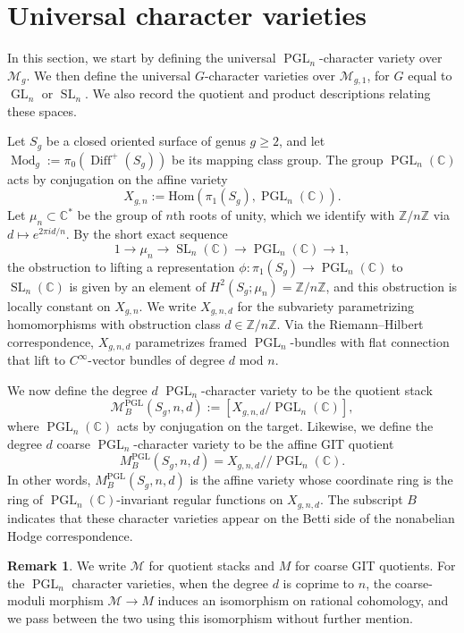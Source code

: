 \documentclass[11pt,reqno]{amsart}
\theoremstyle{plain} %
\theoremstyle{definition}
\newtheorem{remark}[theorem]{Remark}
\newcommand{\CC}{\mathbb{C}}
\newcommand{\Hom}{\mathrm{Hom}}
\newcommand{\M}{\mathcal{M}}
\newcommand{\ZZ}{\mathbb{Z}}
\DeclareMathOperator{\Diff}{Diff}
\DeclareMathOperator{\GL}{GL}
\DeclareMathOperator{\SL}{SL}
\DeclareMathOperator{\PGL}{PGL}
\DeclareMathOperator{\Mod}{Mod}
\providecommand\sslash{/\!\!/}
\begin{document}
\section{Universal character varieties} \label{sec: Betti}

In this section, we start by defining the universal $\PGL_n$-character variety over $\M_g$. We then define the universal $G$-character varieties over $\M_{g,1}$, for $G$ equal to $\GL_n$ or $\SL_n$. We also record the quotient and product descriptions relating these spaces. %

\medskip





Let $S_g$ be a closed oriented surface of genus $g \ge 2$, and let $\Mod_g := \pi_0(\Diff^+(S_g))$ be its mapping class group.  The group  $\PGL_n(\CC)$ acts by conjugation on the affine variety
\[
X_{g,n} := \Hom(\pi_1(S_g), \PGL_n(\CC)).
\]
Let $\mu_n \subset \CC^*$ be the group of $n$th roots of unity, which we identify with $\ZZ/n\ZZ$ via $d \mapsto e^{2\pi i d / n}$. By the short exact sequence %
$$1 \to \mu_n \to \SL_n(\CC) \to \PGL_n(\CC) \to 1,$$
the obstruction to lifting a representation $\phi \colon \pi_1(S_g) \to \PGL_n(\CC)$ to $\SL_n(\CC)$ is given by an element of $H^2(S_g; \mu_n) = \ZZ/n\ZZ$, and this obstruction is locally constant on $X_{g,n}$.  We write $X_{g,n,d}$ for the subvariety parametrizing homomorphisms with obstruction class $d \in \ZZ/n\ZZ$. Via the Riemann--Hilbert correspondence, $X_{g,n,d}$ parametrizes framed $\PGL_n$-bundles with flat connection that lift to $C^\infty$-vector bundles of degree $d$ mod $n$.

We now define the degree $d$ $\PGL_n$-character variety to be the quotient stack
\[
\M_{B}^{\PGL}(S_g,n,d) := [X_{g,n,d} / \PGL_n(\CC)],
\]
where $\PGL_n(\CC)$ acts by conjugation on the target. Likewise, we define the degree $d$ coarse $\PGL_n$-character variety to be the affine GIT quotient
\begin{equation} \label{eq:affineGIT-PGL}
M_B^{\PGL}(S_g,n,d) = X_{g,n,d} \sslash \PGL_n(\CC).
\end{equation}
In other words, $M_B^{\PGL}(S_g,n,d)$ is the affine variety whose coordinate ring is the ring of $\PGL_n(\CC)$-invariant regular functions on $X_{g,n,d}$. The subscript $B$ indicates that these character varieties appear on the Betti side of the nonabelian Hodge correspondence.

\begin{remark}
We write $\M$ for quotient stacks and $M$ for coarse GIT quotients. For the $\PGL_n$ character varieties, when the degree $d$ is coprime to $n$, the coarse-moduli morphism $\M \to M$ induces an isomorphism on rational cohomology, and we pass between the two using this isomorphism without further mention.
\end{remark}
\end{document}
